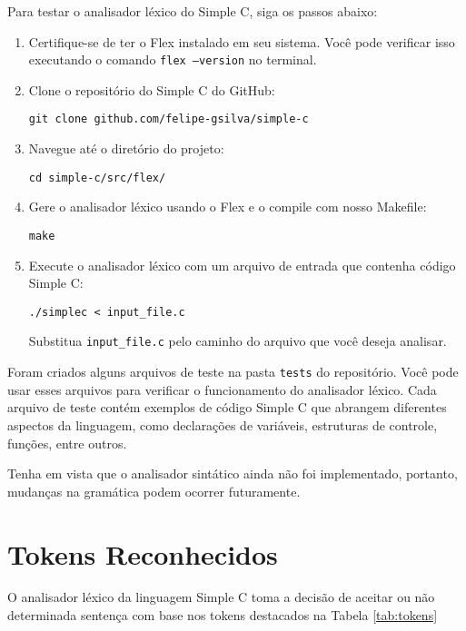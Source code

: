 \documentclass[12pt,a4paper]{article}
\begin{document}
Para testar o analisador léxico do Simple C, siga os passos abaixo:
\begin{enumerate}
  \item Certifique-se de ter o Flex instalado em seu sistema. Você pode verificar isso executando o comando \texttt{flex --version} no terminal.
  \item Clone o repositório do Simple C do GitHub:
 \begin{verbatim}
git clone github.com/felipe-gsilva/simple-c
 \end{verbatim}
  \item Navegue até o diretório do projeto:
 \begin{verbatim}
cd simple-c/src/flex/
 \end{verbatim}
  \item Gere o analisador léxico usando o Flex e o compile com nosso Makefile:
 \begin{verbatim}
make
 \end{verbatim}
  \item Execute o analisador léxico com um arquivo de entrada que contenha código Simple C:
 \begin{verbatim}
./simplec < input_file.c
 \end{verbatim}
 Substitua \texttt{input\_file.c} pelo caminho do arquivo que você deseja analisar.

\end{enumerate}

Foram criados alguns arquivos de teste na pasta \texttt{tests} do repositório. Você pode usar esses arquivos para verificar o funcionamento do analisador léxico. Cada arquivo de teste contém exemplos de código Simple C que abrangem diferentes aspectos da linguagem, como declarações de variáveis, estruturas de controle, funções, entre outros. 

Tenha em vista que o analisador sintático ainda não foi implementado, portanto, mudanças na gramática podem ocorrer futuramente.

\section{Tokens Reconhecidos}
\label{sec:token}

O analisador léxico da linguagem Simple C toma a decisão de aceitar ou não determinada sentença com base nos tokens destacados na Tabela \ref{tab:tokens}
\end{document}
